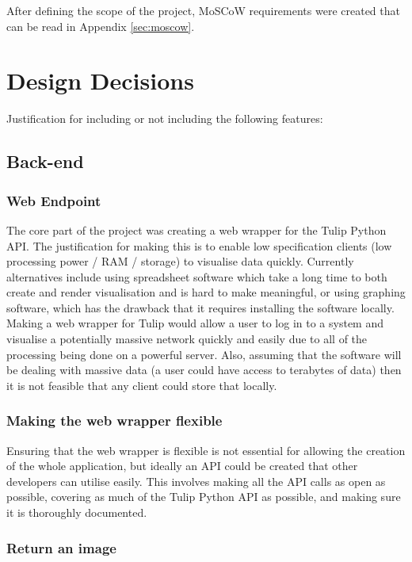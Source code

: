 \documentclass[../dissertation.tex]{subfiles}
\begin{document}
After defining the scope of the project, MoSCoW requirements were created that can be read in Appendix \ref{sec:moscow}.

\section{Design Decisions}
\label{sec:designdec}

Justification for including or not including the following features:

\subsection{Back-end}

\subsubsection{Web Endpoint}

The core part of the project was creating a web wrapper for the Tulip Python API. The justification for making this is to enable low specification clients (low processing power / RAM / storage) to visualise data quickly. Currently alternatives include using spreadsheet software which take a long time to both create and render visualisation and is hard to make meaningful, or using graphing software, which has the drawback that it requires installing the software locally. Making a web wrapper for Tulip would allow a user to log in to a system and visualise a potentially massive network quickly and easily due to all of the processing being done on a powerful server. Also, assuming that the software will be dealing with massive data (a user could have access to terabytes of data) then it is not feasible that any client could store that locally.

\subsubsection{Making the web wrapper flexible}

Ensuring that the web wrapper is flexible is not essential for allowing the creation of the whole application, but ideally an API could be created that other developers can utilise easily. This involves making all the API calls as open as possible, covering as much of the Tulip Python API as possible, and making sure it is thoroughly documented. 

\subsubsection{Return an image}
\end{document}
